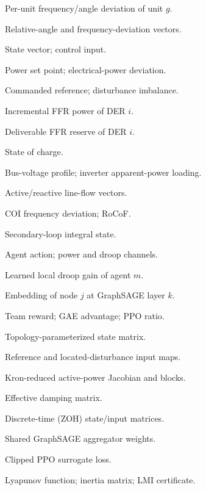 \documentclass[lettersize,journal]{IEEEtran}
\begin{document}
\begin{IEEEdescription}
\item[\emph{Variables}]\hfill
\item[$\Delta\omega_g,\Delta\delta_g$] Per-unit frequency/angle deviation of unit $g$.
\item[$\Delta\boldsymbol{\delta}_{\mathrm{rel}},\Delta\boldsymbol{\omega}$] Relative-angle and frequency-deviation vectors.
\item[$x,\,u_t$] State vector; control input.
\item[$\Delta P_{\mathrm{set},g},\Delta P_{e,g}$] Power set point; electrical-power deviation.
\item[$\Delta P_{\mathrm{ref}},\Delta P_{\mathrm{imb}}$] Commanded reference; disturbance imbalance.
\item[$\Delta P^{\mathrm{ffr}}_{i,t}$] Incremental FFR power of DER $i$.
\item[$R^{\mathrm{ffr}}_{i,t}$] Deliverable FFR reserve of DER $i$.
\item[$\mathrm{SoC}_t$] State of charge.
\item[$V_t,\,S_t$] Bus-voltage profile; inverter apparent-power loading.
\item[$P_t,\,Q_t$] Active/reactive line-flow vectors.
\item[$\Delta f_t,\,\dot f_t$] COI frequency deviation; RoCoF.
\item[$\zeta_t$] Secondary-loop integral state.
\item[$a_m,a^P_m,a^K_m$] Agent action; power and droop channels.
\item[$K_m$] Learned local droop gain of agent $m$.
\item[$H_j^{(k)}$] Embedding of node $j$ at GraphSAGE layer $k$.
\item[$r_t,\,\hat A_t,\,\rho_t$] Team reward; GAE advantage; PPO ratio.

\item[\emph{Matrices, Functions, and Operators}]\hfill
\item[$A_f(\mathcal{G}_t,K_t)$] Topology-parameterized state matrix.
\item[$B_{\mathrm{ref}},B_{\mathrm{net}}$] Reference and located-disturbance input maps.
\item[$\tilde J_r,\,J_{(\cdot)}$] Kron-reduced active-power Jacobian and blocks.
\item[$D(K_t)$] Effective damping matrix.
\item[$\Phi,\,\Gamma$] Discrete-time (ZOH) state/input matrices.
\item[$W_{\mathrm{self}},W_{\mathrm{neigh}}$] Shared GraphSAGE aggregator weights.
\item[$\mathcal{L}^{\mathrm{clip}}$] Clipped PPO surrogate loss.
\item[$V,\,M,\,\mathbf P$] Lyapunov function; inertia matrix; LMI certificate.


\end{IEEEdescription}
\end{document}
